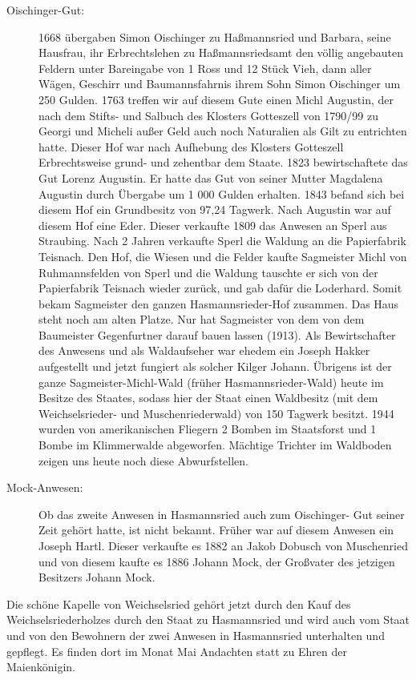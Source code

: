 \documentclass[12pt,a4pager]{book}
\begin{document}
\begin{description}
\item[Oischinger-Gut:] 1668 übergaben Simon Oischinger zu Haßmannsried und
Barbara, seine Hausfrau, ihr Erbrechtslehen zu Haßmannsriedsamt den völlig
angebauten Feldern unter Bareingabe von 1 Ross und 12 Stück Vieh, dann aller
Wägen, Geschirr und Baumannsfahrnis ihrem Sohn Simon Oischinger um 250 Gulden.
1763 treffen wir auf diesem Gute einen Michl Augustin, der nach dem Stifts- und
Salbuch des Klosters Gotteszell von 1790/99 zu Georgi und Micheli außer Geld
auch noch Naturalien als Gilt zu entrichten hatte. Dieser Hof war nach Aufhebung
des Klosters Gotteszell Erbrechtsweise grund- und zehentbar dem Staate. 1823
bewirtschaftete das Gut Lorenz Augustin. Er hatte das Gut von seiner Mutter
Magdalena Augustin durch Übergabe um 1 000 Gulden erhalten. 1843 befand sich bei
diesem Hof ein Grundbesitz von 97,24 Tagwerk. Nach Augustin war auf diesem Hof
eine Eder. Dieser verkaufte 1809 das Anwesen an Sperl aus Straubing. Nach 2
Jahren verkaufte Sperl die Waldung an die Papierfabrik Teisnach. Den Hof, die
Wiesen und die Felder kaufte Sagmeister Michl von Ruhmannsfelden von Sperl und
die Waldung tauschte er sich von der Papierfabrik Teisnach wieder zurück, und
gab dafür die Loderhard. Somit bekam Sagmeister den ganzen Hasmannsrieder-Hof
zusammen. Das Haus steht noch am alten Platze. Nur hat Sagmeister von dem von
dem Baumeister Gegenfurtner darauf bauen lassen (1913). Als Bewirtschafter des
Anwesens und als Waldaufseher war ehedem ein Joseph Hakker aufgestellt und jetzt
fungiert als solcher Kilger Johann. Übrigens ist der ganze Sagmeister-Michl-Wald
(früher Hasmannsrieder-Wald) heute im Besitze des Staates, sodass hier der Staat
einen Waldbesitz (mit dem Weichselsrieder- und Muschenriederwald) von 150
Tagwerk besitzt. 1944 wurden von amerikanischen Fliegern 2 Bomben im Staatsforst
und 1 Bombe im Klimmerwalde abgeworfen. Mächtige Trichter im Waldboden zeigen
uns heute noch diese Abwurfstellen.

\item[Mock-Anwesen:] Ob das zweite Anwesen in Hasmannsried auch zum Oischinger-
Gut seiner Zeit gehört hatte, ist nicht bekannt. Früher war auf diesem Anwesen
ein Joseph Hartl. Dieser verkaufte es 1882 an Jakob Dobusch von Muschenried und
von diesem kaufte es 1886 Johann Mock, der Großvater des jetzigen Besitzers
Johann Mock.
\end{description}

Die schöne Kapelle von Weichselsried gehört jetzt durch den Kauf des
Weichselsriederholzes durch den Staat zu Hasmannsried und wird auch vom Staat
und von den Bewohnern der zwei Anwesen in Hasmannsried unterhalten und gepflegt.
Es finden dort im Monat Mai Andachten statt zu Ehren der Maienkönigin.
\end{document}
